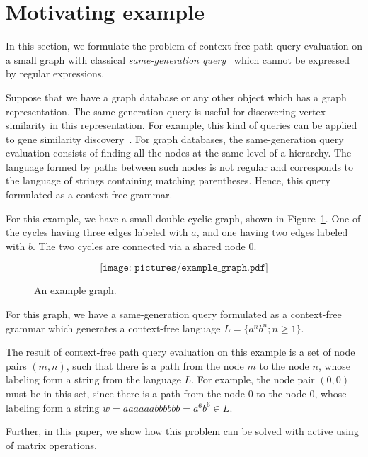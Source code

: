 \section{Motivating example} \label{section_motivating}
In this section, we formulate the problem of context-free path query evaluation on a small graph with classical \textit{same-generation query}~\cite{FndDB} which cannot be expressed by regular expressions.

Suppose that we have a graph database or any other object which has a graph representation. The same-generation query is useful for discovering vertex similarity in this representation. For example, this kind of queries can be applied to gene similarity discovery~\cite{GraphQueryWithEarley}. For graph databases, the same-generation query evaluation consists of finding all the nodes at the same level of a hierarchy. The language formed by paths between such nodes is not regular and corresponds to the language of strings containing matching parentheses. Hence, this query formulated as a context-free grammar.

For this example, we have a small double-cyclic graph, shown in Figure~\ref{Example_Graph}. One of the cycles having three edges labeled with $a$, and one having two edges labeled with $b$. The two cycles are connected via
a shared node $0$.

\begin{figure}[h]
	\[
	\texttt{[image: pictures/example\_graph.pdf]}
	\]
	\caption{An example graph.}
	\label{Example_Graph}
\end{figure}

For this graph, we have a same-generation query formulated as a context-free grammar which generates a context-free language $L=\{a^n b^n; n \geq 1\}$.

The result of context-free path query evaluation on this example is a set of node pairs $(m, n)$, such that there is a path from the node $m$ to the node $n$, whose labeling form a string from the language $L$. For example, the node pair $(0,0)$ must be in this set, since there is a path from the node $0$ to the node $0$, whose labeling form a string $w = aaaaaabbbbbb = a^6b^6 \in L$.

Further, in this paper, we show how this problem can be solved with active using of matrix operations.